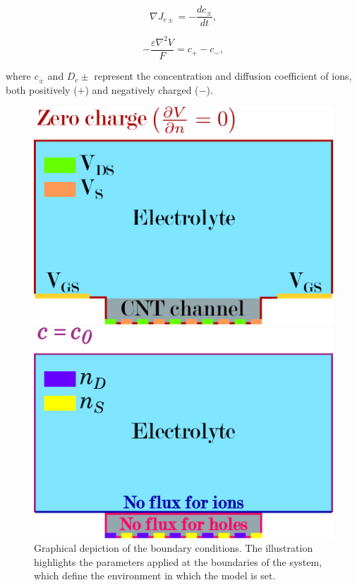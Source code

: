 \begin{equation}
    \label{eq:continuity_ion}
    \nabla J_{c\pm} = -\dfrac{dc_{\pm}}{dt},
\end{equation}

\begin{equation}
    \label{eq:poisson_ion}
    -\dfrac{\varepsilon\nabla^2V}{F} = c_+ - c_-,
\end{equation}

where $c_{\pm}$ and $D_c\pm$ represent the concentration and diffusion coefficient of ions, both positively ($+$) and negatively charged ($-$).

\begin{figure}[h]
    \centering
    \begin{minipage}{0.3\textwidth}
        \centering
        \includegraphics[width=\textwidth]{figures/chapter1/simulations/Fig7_boundaries1.pdf}
    \end{minipage}
    \hspace{10pt}
    \begin{minipage}{0.3\textwidth}
        \includegraphics[width=\textwidth]{figures/chapter1/simulations/Fig7_boundaries2.pdf}
    \end{minipage}
    \caption{Graphical depiction of the boundary conditions. The illustration highlights the parameters applied at the boundaries of the system, which define the environment in which the model is set.}
    \label{fig:boundaryConditions}
\end{figure}

